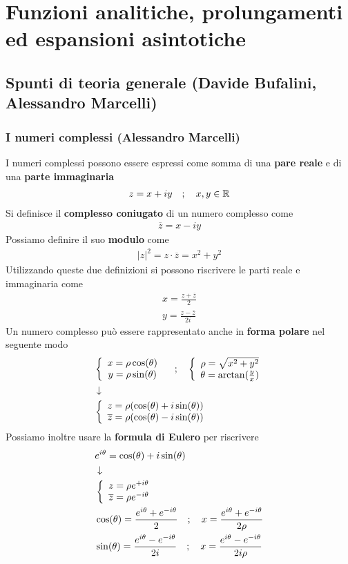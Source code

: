 \chapter{Funzioni analitiche, prolungamenti ed espansioni asintotiche}

\section{Spunti di teoria generale (Davide Bufalini, Alessandro Marcelli)}

\subsection{I numeri complessi (Alessandro Marcelli)}

I numeri complessi possono essere espressi come somma di una \textbf{pare reale} e di una \textbf{parte immaginaria}
\begin{align}
	z = x + iy \quad ; \quad x,y \in \mathbb{R}
\end{align}
Si definisce il \textbf{complesso coniugato} di un numero complesso come
\begin{align}
	\overline{z} = x-iy
\end{align}
Possiamo definire il suo \textbf{modulo} come
\begin{align}
	|z|^2 = z \cdot \overline{z} = x^2 + y^2
\end{align}
Utilizzando queste due definizioni si possono riscrivere le parti reale e immaginaria come
\begin{align}
	x = \frac{z+ \overline{z}}{2}\\
	y = \frac{z- \overline{z}}{2i}
\end{align}
Un numero complesso può essere rappresentato anche in \textbf{forma polare} nel seguente modo
\begin{align}
	&\left\{ \begin{array}{cc} x = \rho \cos (\theta)\\ y = \rho \sin (\theta) \end{array} \right. \quad ; \quad \left\{ \begin{array}{cc} \rho = \sqrt{x^2 + y^2}\\ \theta = \arctan (\frac{y}{x}) \end{array} \right.\\ &\downarrow \nonumber \\
	&\left\{ \begin{array}{cc} z =  \rho (\cos (\theta) + i\sin(\theta))\\ \overline{z} = \rho (\cos (\theta) - i\sin(\theta)) \end{array} \right.
\end{align}
Possiamo inoltre usare la \textbf{formula di Eulero} per riscrivere
\begin{align}
	&e^{i\theta} = \cos(\theta)+ i \sin (\theta)\\ &\downarrow \nonumber \\
	&\left\{ \begin{array}{cc} z = \rho e^{+i\theta}\\ \overline{z} = \rho e^{-i\theta} \end{array} \right.\\
	&\cos (\theta) = \frac{e^{i\theta} + e^{-i\theta}}{2} \quad ; \quad x= \frac{e^{i\theta} + e^{-i\theta}}{2\rho}\\
	&\sin (\theta) = \frac{e^{i\theta} - e^{-i\theta}}{2i} \quad ; \quad x= \frac{e^{i\theta} - e^{-i\theta}}{2i\rho}
\end{align}

